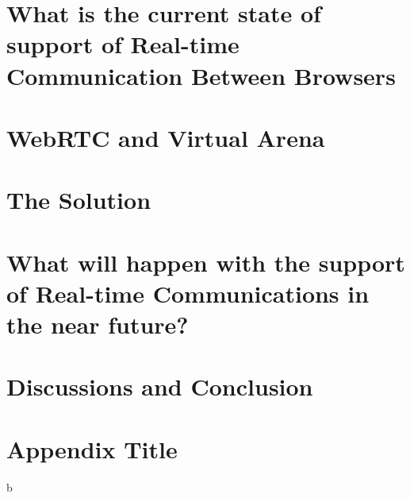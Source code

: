 \documentclass[11pt,a4paper]{report}
\begin{document}
\chapter{What is the current state of support of Real-time Communication Between Browsers}

\chapter{WebRTC and Virtual Arena}


\chapter{The Solution}



\chapter{What will happen with the support of Real-time Communications in the near future?}




\chapter{Discussions and Conclusion}



\appendix
\chapter{Appendix Title}b

\printglossaries



\end{document}
